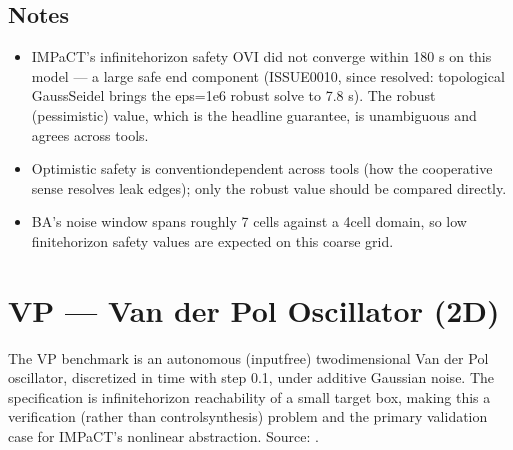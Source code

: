 \documentclass[a4paper,10pt,english]{sphinxmanual}
\begin{document}
\subsection{Notes}
\label{\detokenize{benchmarks/BA:notes}}\begin{itemize}
\item {} 
\sphinxAtStartPar
IMPaCT’s  infinite\sphinxhyphen{}horizon safety OVI did not converge within 180 s on
this model — a large safe end component (ISSUE\sphinxhyphen{}0010, since resolved: topological Gauss\textendash{}Seidel brings the eps=1e\sphinxhyphen{}6 robust solve to 7.8 s). The robust (pessimistic)
value, which is the headline guarantee, is unambiguous and agrees across tools.

\item {} 
\sphinxAtStartPar
Optimistic safety is convention\sphinxhyphen{}dependent across tools (how the cooperative sense
resolves \sphinxcode{\sphinxupquote{{[}0,hi{]}}} leak edges); only the robust value should be compared directly.

\item {} 
\sphinxAtStartPar
BA’s noise window spans roughly 7 cells against a 4\sphinxhyphen{}cell domain, so low
finite\sphinxhyphen{}horizon safety values are expected on this coarse grid.

\end{itemize}

\sphinxstepscope


\section{VP — Van der Pol Oscillator (2D)}
\label{\detokenize{benchmarks/VP:vp-van-der-pol-oscillator-2d}}\label{\detokenize{benchmarks/VP::doc}}
\sphinxAtStartPar
The VP benchmark is an autonomous (input\sphinxhyphen{}free) two\sphinxhyphen{}dimensional Van der Pol oscillator,
discretized in time with step 0.1, under additive Gaussian noise. The specification is
infinite\sphinxhyphen{}horizon reachability of a small target box, making this a verification (rather
than control\sphinxhyphen{}synthesis) problem and the primary validation case for IMPaCT’s nonlinear
abstraction. Source: .
\end{document}
